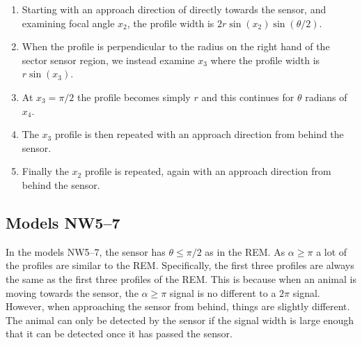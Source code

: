 \begin{enumerate}
\item Starting with an approach direction of directly towards the sensor, and examining focal angle $x_2$, the profile width is $2r\sin(x_2)\sin(\theta/2)$. 
\item When the profile is perpendicular to the radius on the right hand of the sector sensor region, we instead examine $x_3$ where the profile width is $r\sin(x_3)$.
\item At $x_3=\pi/2$ the profile becomes simply $r$ and this continues for $\theta $ radians of $x_4$. 
\item The $x_3$ profile is then repeated with an approach direction from behind the sensor. 
\item Finally the $x_2$ profile is repeated, again with an approach direction from behind the sensor. 
\end{enumerate}



\subsection{Models NW5--7} \label{NW57}

In the models NW5--7, the sensor has $\theta \le \pi/2$ as in the REM. As $\alpha \ge \pi$ a lot of the profiles are similar to the REM. Specifically, the first three profiles are always the same as the first three profiles of the REM. This is because when an animal is moving towards the sensor, the $\alpha \ge \pi$ signal is no different to a $2\pi$ signal. However, when approaching the sensor from behind, things are slightly different. The animal can only be detected by the sensor if the signal width is large enough that it can be detected once it has passed the sensor. 
                    
